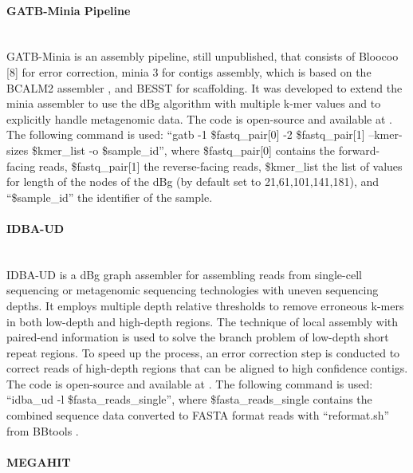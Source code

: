 \paragraph{GATB-Minia Pipeline} \mbox{}\\

GATB-Minia is an assembly pipeline, still unpublished, that consists of Bloocoo [8] for error correction, minia 3 \cite{chikhi_space-efficient_2013} for contigs assembly, which is based on the BCALM2 assembler \cite{chikhi_compacting_2016}, and BESST \cite{sahlin_besst_2014} for scaffolding. It was developed to extend the minia assembler to use the dBg algorithm with multiple k-mer values and to explicitly handle metagenomic data. The code is open-source and available at \cite{noauthor_gatbgatb-minia-pipeline_2022}. The following command is used: “gatb -1 \$fastq\_pair[0] -2 \$fastq\_pair[1] --kmer-sizes \$kmer\_list -o \$sample\_id”, where \$fastq\_pair[0] contains the forward-facing reads, \$fastq\_pair[1] the reverse-facing reads, \$kmer\_list the list of values for length of the nodes of the dBg (by default set to 21,61,101,141,181), and “\$sample\_id” the identifier of the sample. 

\paragraph{IDBA-UD} \mbox{}\\

IDBA-UD \cite{peng_idba-ud_2012} is a dBg graph assembler for assembling reads from single-cell sequencing or metagenomic sequencing technologies with uneven sequencing depths. It employs multiple depth relative thresholds to remove erroneous k-mers in both low-depth and high-depth regions. The technique of local assembly with paired-end information is used to solve the branch problem of low-depth short repeat regions. To speed up the process, an error correction step is conducted to correct reads of high-depth regions that can be aligned to high confidence contigs. The code is open-source and available at \cite{peng_loneknightpyidba_2022}. The following command is used:  “idba\_ud -l \$fasta\_reads\_single”, where \$fasta\_reads\_single contains the combined sequence data converted to FASTA format reads with “reformat.sh” from BBtools \cite{bushnell_bbmerge_2017}. 

\paragraph{MEGAHIT} \mbox{}\\


